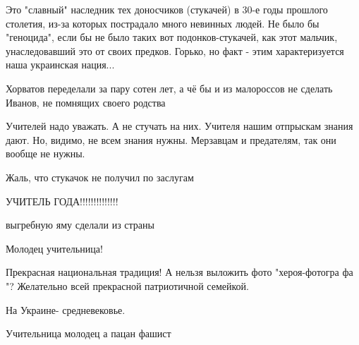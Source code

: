 \begin{itemize}
Это "славный" наследник тех доносчиков (стукачей) в 30-е годы прошлого
столетия, из-за которых пострадало много невинных людей. Не было бы "геноцида",
если бы не было таких вот подонков-стукачей, как этот мальчик, унаследовавший
это от своих предков. Горько, но факт - этим характеризуется наша украинская
нация...



Хорватов переделали за пару сотен лет, а чё бы и из малороссов не сделать
Иванов, не помнящих своего родства

Учителей надо уважать.
А не стучать на них.
Учителя нашим отпрыскам знания дают.
Но, видимо, не всем знания нужны.
Мерзавцам и предателям, так они вообще не нужны.

Жаль, что стукачок не получил по заслугам

УЧИТЕЛЬ ГОДА!!!!!!!!!!!!!!

выгребную яму сделали из страны

Молодец учительница!

Прекрасная национальная традиция! А нельзя выложить фото "хероя-фотогра фа "? Желательно всей прекрасной патриотичной семейкой.

На Украине- средневековье.

Учительница молодец а пацан фашист


\end{itemize} %
